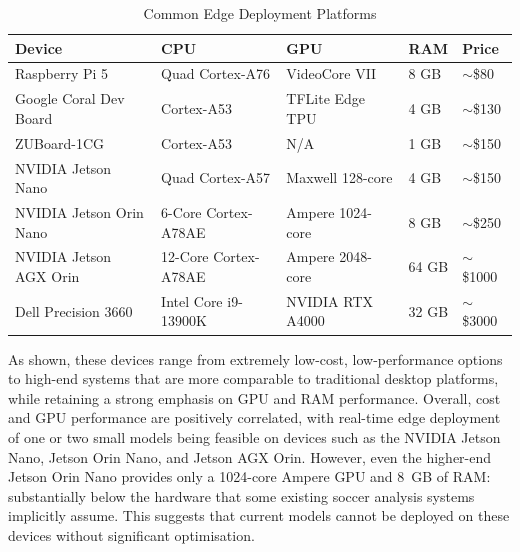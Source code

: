 \begin{table}[H]
    \centering
        \caption{Common Edge Deployment Platforms \cite{xu2025edge,JetsonOrinNano}}
    \small
    \begin{tabular}{lllll}
        \toprule
        \textbf{Device} & \textbf{CPU} & \textbf{GPU} & \textbf{RAM} & \textbf{Price} \\
        \midrule
        Raspberry Pi 5 & Quad Cortex-A76 & VideoCore VII & 8 GB & $\sim$\$80 \\
        Google Coral Dev Board & Cortex-A53 & TFLite Edge TPU & 4 GB & $\sim$\$130 \\
        ZUBoard-1CG & Cortex-A53 & N/A & 1 GB & $\sim$\$150 \\
        NVIDIA Jetson Nano & Quad Cortex-A57 & Maxwell 128-core & 4 GB & $\sim$\$150 \\
        NVIDIA Jetson Orin Nano & 6-Core Cortex-A78AE & Ampere 1024-core & 8 GB & $\sim$\$250 \\
        NVIDIA Jetson AGX Orin & 12-Core Cortex-A78AE & Ampere 2048-core & 64 GB & $\sim$\$1000 \\
        Dell Precision 3660 & Intel Core i9-13900K & NVIDIA RTX A4000 & 32 GB & $\sim$\$3000 \\
        \bottomrule
    \end{tabular}
    \label{tab:edge_devices}
\end{table}

As shown, these devices range from extremely low-cost, low-performance options to high-end systems that are more comparable to traditional desktop platforms, while retaining a strong emphasis on GPU and RAM performance. Overall, cost and GPU performance are positively correlated, with real-time edge deployment of one or two small models being feasible on devices such as the NVIDIA Jetson Nano, Jetson Orin Nano, and Jetson AGX Orin. However, even the higher-end Jetson Orin Nano provides only a 1024-core Ampere GPU and 8~GB of RAM: substantially below the hardware that some existing soccer analysis systems implicitly assume. This suggests that current models cannot be deployed on these devices without significant optimisation.

